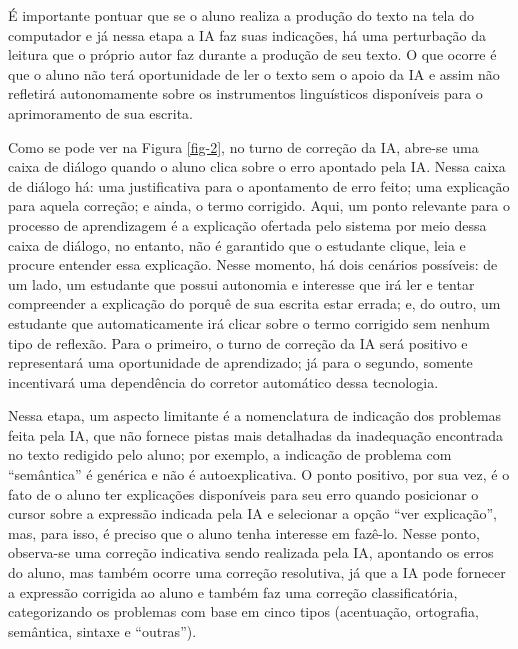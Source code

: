 \documentclass[portuguese]{textolivre}
\begin{document}
É importante pontuar que se o aluno realiza a produção do texto na tela do computador e já nessa etapa a IA faz suas indicações, há uma perturbação da leitura que o próprio autor faz durante a produção de seu texto. O que ocorre é que o aluno não terá oportunidade de ler o texto sem o apoio da IA e assim não refletirá autonomamente sobre os instrumentos linguísticos disponíveis para o aprimoramento de sua escrita.

Como se pode ver na Figura \ref{fig-2}, no turno de correção da IA, abre-se uma caixa de diálogo quando o aluno clica sobre o erro apontado pela IA. Nessa caixa de diálogo há: uma justificativa para o apontamento de erro feito; uma explicação para aquela correção; e ainda, o termo corrigido. Aqui, um ponto relevante para o processo de aprendizagem é a explicação ofertada pelo sistema por meio dessa caixa de diálogo, no entanto, não é garantido que o estudante clique, leia e procure entender essa explicação. Nesse momento, há dois cenários possíveis: de um lado, um estudante que possui autonomia e interesse que irá ler e tentar compreender a explicação do porquê de sua escrita estar errada; e, do outro, um estudante que automaticamente irá clicar sobre o termo corrigido sem nenhum tipo de reflexão. Para o primeiro, o turno de correção da IA será positivo e representará uma oportunidade de aprendizado; já para o segundo, somente incentivará uma dependência do corretor automático dessa tecnologia.

Nessa etapa, um aspecto limitante é a nomenclatura de indicação dos problemas feita pela IA, que não fornece pistas mais detalhadas da inadequação encontrada no texto redigido pelo aluno; por exemplo, a indicação de problema com ``semântica'' é genérica e não é autoexplicativa. O ponto positivo, por sua vez, é o fato de o aluno ter explicações disponíveis para seu erro quando posicionar o cursor sobre a expressão indicada pela IA e selecionar a opção ``ver explicação'', mas, para isso, é preciso que o aluno tenha interesse em fazê-lo. Nesse ponto, observa-se uma correção indicativa sendo realizada pela IA, apontando os erros do aluno, mas também ocorre uma correção resolutiva, já que a IA pode fornecer a expressão corrigida ao aluno e também faz uma correção classificatória, categorizando os problemas com base em cinco tipos (acentuação, ortografia, semântica, sintaxe e ``outras'').
\end{document}
